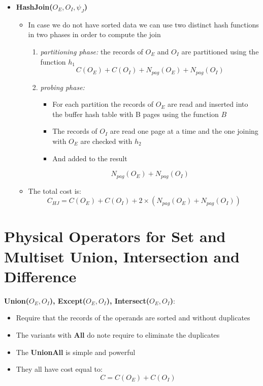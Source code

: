 \begin{itemize}
    \item \textbf{HashJoin($O_E,O_I,\psi_J$)}
    \begin{itemize}
        \item In case we do not have sorted data we can use two distinct hash functions in two phases in order to compute the join
        \begin{enumerate}
            \item \textit{partitioning phase:} the records of $O_E$ and $O_I$ are partitioned using the function $h_1$
            $$C(O_E) + C(O_I) + N_{pag}(O_E) + N_{pag}(O_I)$$
            \item \textit{probing phase:}
            \begin{itemize}
                \item For each partition the records of $O_E$ are read and inserted into the buffer hash table with B pages using the function $B$
                \item The records of $O_I$ are read one page at a time and the one joining with $O_E$ are checked with $h_2$
                \item And added to the result
            \end{itemize}
            $$N_{pag}(O_E) + N_{pag}(O_I)$$
        \end{enumerate}
        \item The total cost is:
        $$C_{HJ} = C(O_E) + C(O_I) + 2 \times (N_{pag}(O_E) + N_{pag}(O_I))$$
    \end{itemize}
\end{itemize}

\section{Physical Operators for Set and Multiset Union, Intersection and Difference}
\textbf{Union($O_E, O_I$), Except($O_E, O_I$), Intersect($O_E, O_I$)}:
\begin{itemize}
    \item Require that the records of the operands are sorted and without duplicates
    \item The variants with \textbf{All} do note require to eliminate the duplicates
    \item The \textbf{UnionAll} is simple and powerful
    \item They all have cost equal to:
    $$C = C(O_E) + C(O_I)$$
\end{itemize} 
